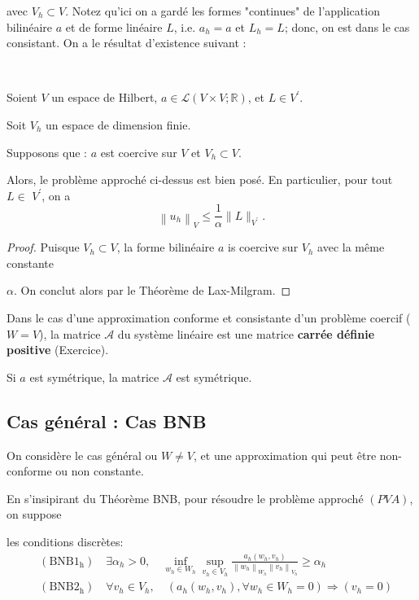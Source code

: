 avec  $V_{h} \subset V$.  Notez qu'ici on a gardé les formes "continues" de l'application  bilinéaire $a$ et de forme linéaire  $L$, i.e. $a_h=a$ et $L_h=L$; donc, on est dans le cas consistant.  On a le résultat d'existence suivant :

\begin{proposition}\
	
Soient  $V$ un espace de Hilbert,  $a \in \mathcal{L}(V \times V ; \mathbb{R})$, et $L \in V^{\prime}$. 

Soit  $V_{h}$ un espace de dimension finie.

Supposons que : $a$ est  coercive sur   $V$ et  $V_{h} \subset V$.

Alors,   le  problème approché ci-dessus est bien posé. En particulier,  pour tout $L \in$ $V^{\prime}$, on a 
$$
\left\|u_{h}\right\|_{V} \leq \frac{1}{\alpha}\|L\|_{V^{\prime}}.
$$ 

\end{proposition}

\begin{proof}
Puisque  $V_{h} \subset V$, la forme bilinéaire $a$ is coercive sur  $V_{h}$ avec la même constante 

$\alpha$.  On conclut alors par le Théorème de  Lax-Milgram.
\end{proof}


\begin{remark}
Dans le cas  d'une approximation conforme et  consistante d'un  problème coercif 
($W=V$), 
la matrice $\mathcal{A}$ du système linéaire est une matrice {\bf carrée définie  positive} (Exercice).  
\end{remark}

\begin{remark}
Si  $a$ est  symétrique,  la matrice $\mathcal{A} $  est  symétrique.
\end{remark}




\subsection{Cas général : Cas  BNB}

On considère le cas général ou $W\neq V$, et  une approximation qui peut être non-conforme ou non constante.


En s'insipirant du  Théorème BNB,  pour  résoudre le problème approché $(PVA)$, on suppose 

les  conditions  discrètes:
$$
\begin{aligned}
	&\left(\mathrm{BNB} 1_{\mathrm{h}}\right) \quad  \exists \alpha_{h}>0, \quad \inf _{w_{h} \in W_{h}} \sup _{v_{h} \in V_{h}} \frac{a_{h}\left(w_{h}, v_{h}\right)}{\left\|w_{h}\right\|_{W_{h}}\left\|v_{h}\right\|_{V_{h}}} \geq \alpha_{h} \\
	&\left(\mathrm{BNB} 2_{\mathrm{h}}\right) \quad \forall v_{h} \in V_{h}, \quad\left( a_{h}\left(w_{h}, v_{h}\right), \forall w_{h} \in W_{h}=0\right) \Longrightarrow\left(v_{h}=0\right)
\end{aligned}
$$

